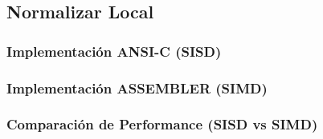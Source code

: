     \subsection{Normalizar Local}
        \subsubsection{Implementación ANSI-C (SISD)}
        \subsubsection{Implementación ASSEMBLER (SIMD)}
        \subsubsection{Comparación de Performance (SISD vs SIMD)}
